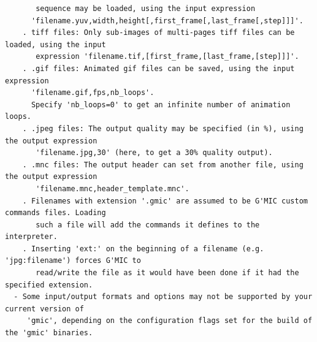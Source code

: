 \documentclass[a4paper,11pt,twoside]{book}
\begin{document}
\begin{lstlisting}
       sequence may be loaded, using the input expression 
      'filename.yuv,width,height[,first_frame[,last_frame[,step]]]'. 
    . tiff files: Only sub-images of multi-pages tiff files can be loaded, using the input 
       expression 'filename.tif,[first_frame,[last_frame,[step]]]'. 
    . .gif files: Animated gif files can be saved, using the input expression 
      'filename.gif,fps,nb_loops'. 
      Specify 'nb_loops=0' to get an infinite number of animation loops. 
    . .jpeg files: The output quality may be specified (in %), using the output expression 
       'filename.jpg,30' (here, to get a 30% quality output). 
    . .mnc files: The output header can set from another file, using the output expression 
       'filename.mnc,header_template.mnc'. 
    . Filenames with extension '.gmic' are assumed to be G'MIC custom commands files. Loading 
       such a file will add the commands it defines to the interpreter. 
    . Inserting 'ext:' on the beginning of a filename (e.g. 'jpg:filename') forces G'MIC to 
       read/write the file as it would have been done if it had the specified extension. 
  - Some input/output formats and options may not be supported by your current version of 
     'gmic', depending on the configuration flags set for the build of the 'gmic' binaries.
\end{lstlisting}
\normalsize
\end{document}
